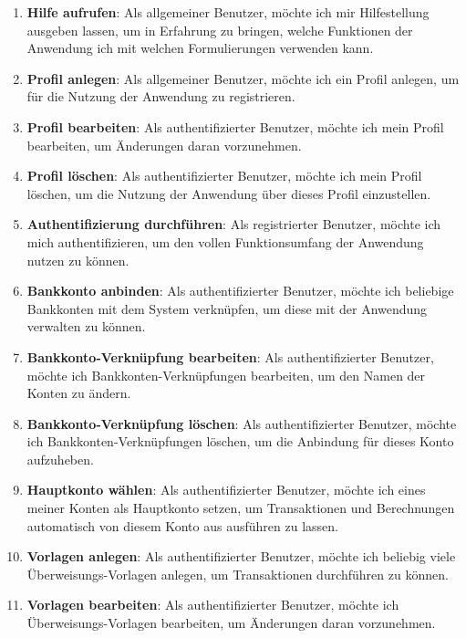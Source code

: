 \begin{enumerate}
\item\textbf{Hilfe aufrufen}: Als allgemeiner Benutzer, möchte ich mir Hilfestellung ausgeben lassen, um in Erfahrung zu bringen, welche Funktionen der Anwendung ich mit welchen Formulierungen verwenden kann.

\item\textbf{Profil anlegen}: Als allgemeiner Benutzer, möchte ich ein Profil anlegen, um für die Nutzung der Anwendung zu registrieren.

\item\textbf{Profil bearbeiten}: Als authentifizierter Benutzer, möchte ich mein Profil bearbeiten, um Änderungen daran vorzunehmen.

\item\textbf{Profil löschen}: Als authentifizierter Benutzer, möchte ich mein Profil löschen, um die Nutzung der Anwendung über dieses Profil einzustellen.

\item\textbf{Authentifizierung durchführen}: Als registrierter Benutzer, möchte ich mich authentifizieren, um den vollen Funktionsumfang der Anwendung nutzen zu können.

\item\textbf{Bankkonto anbinden}: Als authentifizierter Benutzer, möchte ich beliebige Bankkonten mit dem System verknüpfen, um diese mit der Anwendung verwalten zu können.

\item\textbf{Bankkonto-Verknüpfung bearbeiten}: Als authentifizierter Benutzer, möchte ich Bankkonten-Verknüpfungen bearbeiten, um den Namen der Konten zu ändern.

\item\textbf{Bankkonto-Verknüpfung löschen}: Als authentifizierter Benutzer, möchte ich Bankkonten-Verknüpfungen löschen, um die Anbindung für dieses Konto aufzuheben.

\item\textbf{Hauptkonto wählen}: Als authentifizierter Benutzer, möchte ich eines meiner Konten als Hauptkonto setzen, um Transaktionen und Berechnungen automatisch von diesem Konto aus ausführen zu lassen.

\item\textbf{Vorlagen anlegen}: Als authentifizierter Benutzer, möchte ich beliebig viele Überweisungs-Vorlagen anlegen, um Transaktionen durchführen zu können.

\item\textbf{Vorlagen bearbeiten}: Als authentifizierter Benutzer, möchte ich Überweisungs-Vorlagen bearbeiten, um Änderungen daran vorzunehmen.


\end{enumerate}
